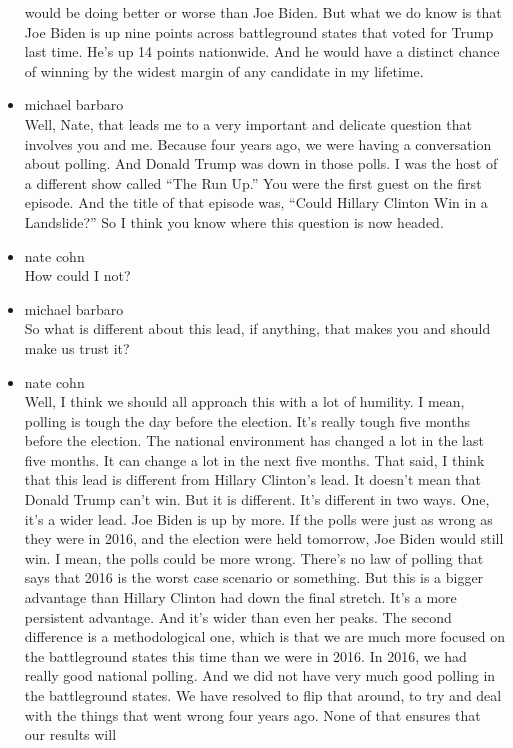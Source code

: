 \begin{itemize}
  would be doing better or worse than Joe Biden. But what we do know is
  that Joe Biden is up nine points across battleground states that voted
  for Trump last time. He's up 14 points nationwide. And he would have a
  distinct chance of winning by the widest margin of any candidate in my
  lifetime.
\item
  michael barbaro\\
  Well, Nate, that leads me to a very important and delicate question
  that involves you and me. Because four years ago, we were having a
  conversation about polling. And Donald Trump was down in those polls.
  I was the host of a different show called ``The Run Up.'' You were the
  first guest on the first episode. And the title of that episode was,
  ``Could Hillary Clinton Win in a Landslide?'' So I think you know
  where this question is now headed.
\item
  nate cohn\\
  How could I not?
\item
  michael barbaro\\
  So what is different about this lead, if anything, that makes you and
  should make us trust it?
\item
  nate cohn\\
  Well, I think we should all approach this with a lot of humility. I
  mean, polling is tough the day before the election. It's really tough
  five months before the election. The national environment has changed
  a lot in the last five months. It can change a lot in the next five
  months. That said, I think that this lead is different from Hillary
  Clinton's lead. It doesn't mean that Donald Trump can't win. But it is
  different. It's different in two ways. One, it's a wider lead. Joe
  Biden is up by more. If the polls were just as wrong as they were in
  2016, and the election were held tomorrow, Joe Biden would still win.
  I mean, the polls could be more wrong. There's no law of polling that
  says that 2016 is the worst case scenario or something. But this is a
  bigger advantage than Hillary Clinton had down the final stretch. It's
  a more persistent advantage. And it's wider than even her peaks. The
  second difference is a methodological one, which is that we are much
  more focused on the battleground states this time than we were in
  2016. In 2016, we had really good national polling. And we did not
  have very much good polling in the battleground states. We have
  resolved to flip that around, to try and deal with the things that
  went wrong four years ago. None of that ensures that our results will

\end{itemize}
